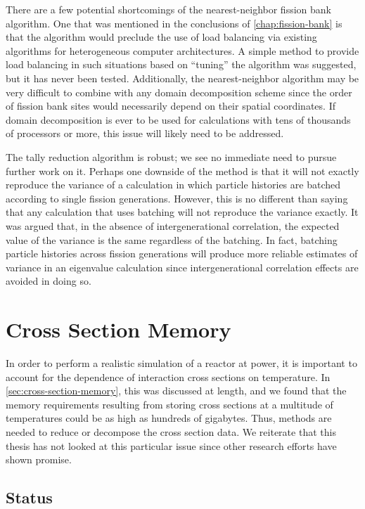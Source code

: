 There are a few potential shortcomings of the nearest-neighbor fission bank
algorithm. One that was mentioned in the conclusions of
\autoref{chap:fission-bank} is that the algorithm would preclude the use of load
balancing via existing algorithms for heterogeneous computer architectures. A
simple method to provide load balancing in such situations based on ``tuning''
the algorithm was suggested, but it has never been tested. Additionally, the
nearest-neighbor algorithm may be very difficult to combine with any domain
decomposition scheme since the order of fission bank sites would necessarily
depend on their spatial coordinates. If domain decomposition is ever to be used
for calculations with tens of thousands of processors or more, this issue will
likely need to be addressed.

The tally reduction algorithm is robust; we see no immediate need to pursue
further work on it. Perhaps one downside of the method is that it will not
exactly reproduce the variance of a calculation in which particle histories are
batched according to single fission generations. However, this is no different
than saying that any calculation that uses batching will not reproduce the
variance exactly. It was argued that, in the absence of intergenerational
correlation, the expected value of the variance is the same regardless of the
batching. In fact, batching particle histories across fission generations will
produce more reliable estimates of variance in an eigenvalue calculation since
intergenerational correlation effects are avoided in doing so.

\section{Cross Section Memory}

In order to perform a realistic simulation of a reactor at power, it is
important to account for the dependence of interaction cross sections on
temperature. In \autoref{sec:cross-section-memory}, this was discussed at
length, and we found that the memory requirements resulting from storing cross
sections at a multitude of temperatures could be as high as hundreds of
gigabytes. Thus, methods are needed to reduce or decompose the cross section
data. We reiterate that this thesis has not looked at this particular issue
since other research efforts have shown promise.

\subsection{Status}

